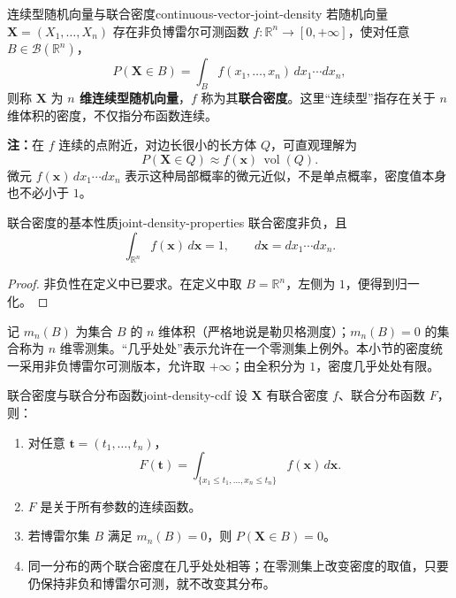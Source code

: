 \begin{mydefinition}{连续型随机向量与联合密度}{continuous-vector-joint-density}
若随机向量 $\boldsymbol X=(X_1,\ldots,X_n)$ 存在非负博雷尔可测函数 $f:\mathbb R^n\to[0,+\infty]$，使对任意 $B\in\mathcal B(\mathbb R^n)$，
\[
P(\boldsymbol X\in B)=\int_B f(x_1,\ldots,x_n)\,dx_1\cdots dx_n,
\]
则称 $\boldsymbol X$ 为 \textbf{$n$ 维连续型随机向量}，$f$ 称为其\textbf{联合密度}。这里“连续型”指存在关于 $n$ 维体积的密度，不仅指分布函数连续。
\end{mydefinition}

\textbf{注：}\quad 在 $f$ 连续的点附近，对边长很小的长方体 $Q$，可直观理解为
\[
P(\boldsymbol X\in Q)\approx f(\boldsymbol x)\,\operatorname{vol}(Q).
\]
微元 $f(\boldsymbol x)\,dx_1\cdots dx_n$ 表示这种局部概率的微元近似，不是单点概率，密度值本身也不必小于 $1$。

\begin{proposition}{联合密度的基本性质}{joint-density-properties}
联合密度非负，且
\[
\int_{\mathbb R^n}f(\boldsymbol x)\,d\boldsymbol x=1,
\qquad d\boldsymbol x=dx_1\cdots dx_n.
\]
\end{proposition}
\begin{proof}
非负性在定义中已要求。在定义中取 $B=\mathbb R^n$，左侧为 $1$，便得到归一化。
\end{proof}

记 $m_n(B)$ 为集合 $B$ 的 $n$ 维体积（严格地说是勒贝格测度）；$m_n(B)=0$ 的集合称为 $n$ 维零测集。“几乎处处”表示允许在一个零测集上例外。本小节的密度统一采用非负博雷尔可测版本，允许取 $+\infty$；由全积分为 $1$，密度几乎处处有限。

\begin{proposition}{联合密度与联合分布函数}{joint-density-cdf}
设 $\boldsymbol X$ 有联合密度 $f$、联合分布函数 $F$，则：
\begin{enumerate}
\item 对任意 $\boldsymbol t=(t_1,\ldots,t_n)$，
\[
F(\boldsymbol t)=\int_{\{x_1\leq t_1,\ldots,x_n\leq t_n\}}
 f(\boldsymbol x)\,d\boldsymbol x.
\]
\item $F$ 是关于所有参数的连续函数。
\item 若博雷尔集 $B$ 满足 $m_n(B)=0$，则 $P(\boldsymbol X\in B)=0$。
\item 同一分布的两个联合密度在几乎处处相等；在零测集上改变密度的取值，只要仍保持非负和博雷尔可测，就不改变其分布。
\end{enumerate}
\end{proposition}

